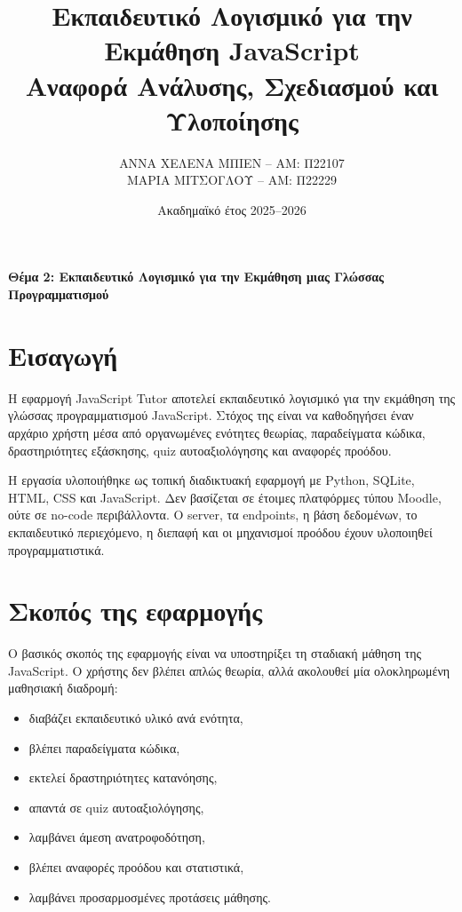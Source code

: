 \documentclass[12pt,a4paper]{article}
\title{\textbf{Εκπαιδευτικό Λογισμικό για την Εκμάθηση JavaScript}\\
\large Αναφορά Ανάλυσης, Σχεδιασμού και Υλοποίησης}
\author{
ΑΝΝΑ ΧΕΛΕΝΑ ΜΠΙΕΝ -- ΑΜ: Π22107\\
ΜΑΡΙΑ ΜΙΤΣΟΓΛΟΥ -- ΑΜ: Π22229
}
\date{Ακαδημαϊκό έτος 2025--2026}
\newcommand{\textlatin}[1]{\textenglish{#1}}
\begin{document}
\maketitle

\begin{center}
\textbf{Θέμα 2: Εκπαιδευτικό Λογισμικό για την Εκμάθηση μιας Γλώσσας Προγραμματισμού}
\end{center}

\tableofcontents
\newpage

\section{Εισαγωγή}

Η εφαρμογή \textlatin{JavaScript Tutor} αποτελεί εκπαιδευτικό λογισμικό για την εκμάθηση της γλώσσας προγραμματισμού \textlatin{JavaScript}. Στόχος της είναι να καθοδηγήσει έναν αρχάριο χρήστη μέσα από οργανωμένες ενότητες θεωρίας, παραδείγματα κώδικα, δραστηριότητες εξάσκησης, quiz αυτοαξιολόγησης και αναφορές προόδου.

Η εργασία υλοποιήθηκε ως τοπική διαδικτυακή εφαρμογή με \textlatin{Python}, \textlatin{SQLite}, \textlatin{HTML}, \textlatin{CSS} και \textlatin{JavaScript}. Δεν βασίζεται σε έτοιμες πλατφόρμες τύπου \textlatin{Moodle}, ούτε σε no-code περιβάλλοντα. Ο server, τα endpoints, η βάση δεδομένων, το εκπαιδευτικό περιεχόμενο, η διεπαφή και οι μηχανισμοί προόδου έχουν υλοποιηθεί προγραμματιστικά.

\section{Σκοπός της εφαρμογής}

Ο βασικός σκοπός της εφαρμογής είναι να υποστηρίξει τη σταδιακή μάθηση της \textlatin{JavaScript}. Ο χρήστης δεν βλέπει απλώς θεωρία, αλλά ακολουθεί μία ολοκληρωμένη μαθησιακή διαδρομή:

\begin{itemize}[leftmargin=1.2cm]
  \item διαβάζει εκπαιδευτικό υλικό ανά ενότητα,
  \item βλέπει παραδείγματα κώδικα,
  \item εκτελεί δραστηριότητες κατανόησης,
  \item απαντά σε quiz αυτοαξιολόγησης,
  \item λαμβάνει άμεση ανατροφοδότηση,
  \item βλέπει αναφορές προόδου και στατιστικά,
  \item λαμβάνει προσαρμοσμένες προτάσεις μάθησης.
\end{itemize}
\end{document}
